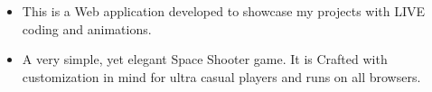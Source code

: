 \documentclass[10pt,a4paper,ragged2e]{altacv}
\begin{document}
\begin{itemize}
\item This is a Web application developed to showcase my projects with LIVE coding and animations.
\end{itemize}


\begin{itemize}
\item A very simple, yet elegant Space Shooter game. It is Crafted with customization in mind for ultra casual players and runs on all browsers.  
\end{itemize}















\end{document}
